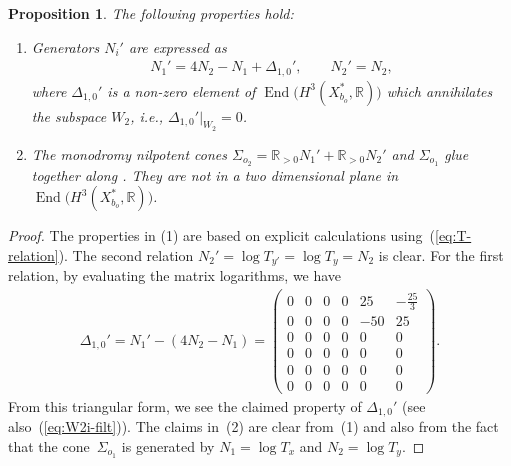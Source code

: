 \documentclass[pdftex]{sigma}
\numberwithin{equation}{section}
\newtheorem{Proposition}[Theorem]{Proposition}
\begin{document}
\begin{Proposition}
\label{prop:Sigma0+Sigma2}The following properties hold:
\begin{enumerate}\itemsep=0pt
\item[{\rm (1)}] Generators $N_{i}'$ are expressed as
\begin{gather*}
N_{1}'=4N_{2}-N_{1}+\Delta_{1,0}',\qquad N_{2}'=N_{2},
\end{gather*}
where $\Delta_{1,0}'$ is a non-zero element of $\operatorname{End}\big(H^{3}(X_{b_{o}}^{*},\mathbb{R})\big)$ which annihilates the subspace $W_{2}$, i.e., $\Delta_{1,0}'\vert_{W_{2}}=0$.

\item[{\rm (2)}] The monodromy nilpotent cones $\Sigma_{o_{2}}=\mathbb{R}_{>0}N_{1}'+\mathbb{R}_{>0}N_{2}'$ and $\Sigma_{o_{1}}$ glue together along . They are not in a two dimensional plane in $\operatorname{End}\big(H^{3}(X_{b_{o}}^{*},\mathbb{R})\big)$.
\end{enumerate}\end{Proposition}
\begin{proof} The properties in (1) are based on explicit calculations using~(\ref{eq:T-relation}). The second relation $N_{2}'=\log T_{y'}=\log T_{y}=N_{2}$ is clear. For the first relation, by evaluating the matrix logarithms, we have
\begin{gather*}
\Delta_{1,0}'=N_{1}'-(4N_{2}-N_{1})=\left(\begin{smallmatrix}0 & 0 & 0 & 0 & 25 & -\frac{25}{3}\\
0 & 0 & 0 & 0 & -50 & 25\\
0 & 0 & 0 & 0 & 0 & 0\\
0 & 0 & 0 & 0 & 0 & 0\\
0 & 0 & 0 & 0 & 0 & 0\\
0 & 0 & 0 & 0 & 0 & 0
\end{smallmatrix}\right).
\end{gather*}
From this triangular form, we see the claimed property of $\Delta_{1,0}'$ (see also~(\ref{eq:W2i-filt})). The claims in~(2) are clear from~(1) and also from the fact that the cone~$\Sigma_{o_{1}}$ is generated by $N_{1}=\log T_{x}$ and $N_{2}=\log T_{y}$.
\end{proof}
\end{document}

